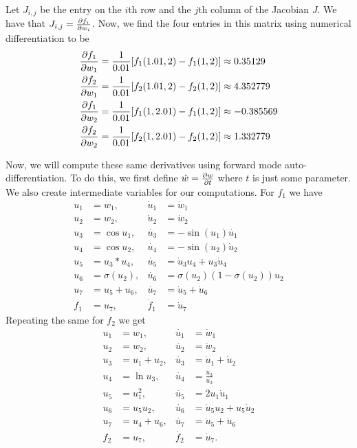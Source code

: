 \documentclass[twoside]{article}
\begin{document}
Let $J_{i,j}$ be the entry on the $i$th row and the $j$th column of the Jacobian $J$.
We have that $J_{i,j} = \pdv{f_{i}}{w_{i}}$. Now, we find the four entries in this
matrix using numerical differentiation to be
\begin{align*}
	\pdv{f_{1}}{w_{1}} & = \frac{1}{0.01}[f_{1}(1.01, 2) - f_{1}(1, 2)] \approx 0.35129   \\
	\pdv{f_{2}}{w_{1}} & = \frac{1}{0.01}[f_{2}(1.01, 2) - f_{2}(1, 2)] \approx 4.352779  \\
	\pdv{f_{1}}{w_{2}} & = \frac{1}{0.01}[f_{1}(1, 2.01) - f_{1}(1, 2)] \approx -0.385569 \\
	\pdv{f_{2}}{w_{2}} & = \frac{1}{0.01}[f_{2}(1, 2.01) - f_{2}(1, 2)] \approx 1.332779  \\
\end{align*}

Now, we will compute these same derivatives using forward mode auto-differentiation.
To do this, we first define $\dot{w} = \pdv{w}{t}$ where $t$ is just some parameter.
We also create intermediate variables for our computations. For $f_{1}$ we have
\begin{align*}
	u_{1} & = w_{1},         & \dot{u}_{1} & = \dot{w}_{1}                           \\
	u_{2} & = w_{2},         & \dot{u}_{2} & = \dot{w}_{2}                           \\
	u_{3} & = \cos u_{1},    & \dot{u_{3}} & = -\sin(u_{1})\dot{u_{1}}               \\
	u_{4} & = \cos u_{2},    & \dot{u_{4}} & = -\sin(u_{2})\dot{u}_{2}               \\
	u_{5} & = u_{3}*u_{4},   & \dot{u_{5}} & = \dot{u}_{3}u_{4} + u_{3}\dot{u}_{4}   \\
	u_{6} & = \sigma(u_{2}), & \dot{u_{6}} & = \sigma(u_{2})(1 - \sigma(u_{2}))u_{2} \\
	u_{7} & = u_{5} + u_{6}, & \dot{u_{7}} & = \dot{u}_{5} + \dot{u}_{6}             \\
	f_{1} & = u_{7},         & \dot{f}_{1} & = \dot{u}_{7}
\end{align*}
Repeating the same for $f_{2}$ we get
\begin{align*}
	u_{1} & = w_{1},         & \dot{u_{1}} & = \dot{w}_{1}                         \\
	u_{2} & = w_{2},         & \dot{u_{2}} & = \dot{w}_{2}                         \\
	u_{3} & = u_{1} + u_{2}, & \dot{u_{3}} & = \dot{u}_{1} + \dot{u}_{2}           \\
	u_{4} & = \ln u_{3},     & \dot{u_{4}} & = \frac{\dot{u}_{3}}{u_{3}}           \\
	u_{5} & = u_{1}^{2},     & \dot{u_{5}} & = 2u_{1}\dot{u}_{1}                   \\
	u_{6} & = u_{5}u_{2},    & \dot{u_{6}} & = \dot{u}_{5}u_{2} + u_{5}\dot{u}_{2} \\
	u_{7} & = u_{4} + u_{6}, & \dot{u_{7}} & = \dot{u}_{5} + \dot{u}_{6}           \\
	f_{2} & = u_{7},         & \dot{f_{2}} & = \dot{u}_{7}.
\end{align*}
\end{document}
